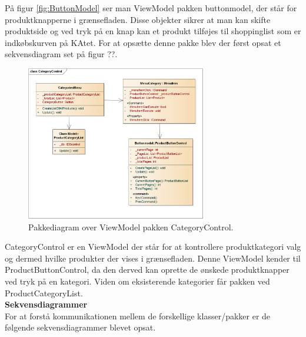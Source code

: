 På figur \ref{fig:ButtonModel} ser man ViewModel pakken buttonmodel, der står for produktknapperne i grænsefladen. Disse objekter sikrer at man kan skifte produktside og ved tryk på en knap kan et produkt tilføjes til shoppinglist som er indkøbskurven på \gls{KA}tet. For at opsætte denne pakke blev der først opsat et sekvensdiagram set på figur ??.

\begin{figure}[H]
	\centering
	\includegraphics[width=0.7\textwidth]{Systemdesign/Frontend/GUI/DesignOgStruktur/Pics/KlassediagramCategoryControl}
	\caption{Pakkediagram over ViewModel pakken CategoryControl.}
	\label{fig:CategoryControl}
\end{figure}

CategoryControl er en ViewModel der står for at kontrollere produktkategori valg og dermed hvilke produkter der vises i grænsefladen. Denne ViewModel kender til ProductButtonControl, da den derved kan oprette de ønskede produktknapper ved tryk på en kategori. Viden om eksisterende kategorier får pakken ved ProductCategoryList. \\

\textbf{Sekvensdiagrammer} \\
For at forstå kommunikationen mellem de forskellige klasser/pakker er de følgende sekvensdiagrammer blevet opsat. \\

